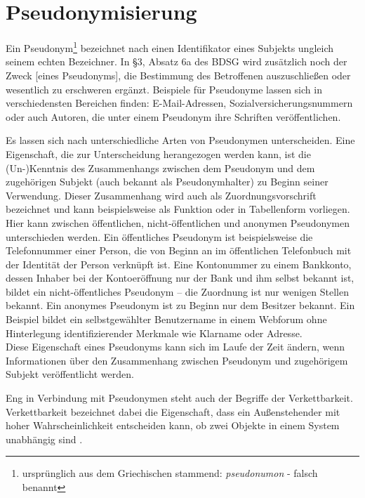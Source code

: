 \section{Pseudonymisierung}

\label{sec_basics_pseudonymity}

Ein Pseudonym\footnote{
	ursprünglich aus dem Griechischen stammend: \textit{pseudonumon} - falsch benannt
} bezeichnet nach \cite{pfitzmann2010} einen Identifikator eines Subjekts ungleich seinem echten Bezeichner. In §3, Absatz 6a des BDSG wird zusätzlich noch der \glqq Zweck [eines Pseudonyms], die Bestimmung des Betroffenen auszuschließen oder wesentlich zu erschweren\grqq{}\cite{TODO} ergänzt. Beispiele für Pseudonyme lassen sich in verschiedensten Bereichen finden: E-Mail-Adressen, Sozialversicherungsnummern oder auch Autoren, die unter einem Pseudonym ihre Schriften veröffentlichen.

Es lassen sich nach \cite{pfitzmann1990} unterschiedliche Arten von Pseudonymen unterscheiden. Eine Eigenschaft, die zur Unterscheidung herangezogen werden kann, ist die (Un-)Kenntnis des Zusammenhangs zwischen dem Pseudonym und dem zugehörigen Subjekt (auch bekannt als Pseudonymhalter) zu Beginn seiner Verwendung. Dieser Zusammenhang wird auch als Zuordnungsvorschrift bezeichnet und kann beispielsweise als Funktion oder in Tabellenform vorliegen.\\
Hier kann zwischen öffentlichen, nicht-öffentlichen und anonymen Pseudonymen unterschieden werden. Ein öffentliches Pseudonym ist beispielsweise die Telefonnummer einer Person, die von Beginn an im öffentlichen Telefonbuch mit der Identität der Person verknüpft ist. Eine Kontonummer zu einem Bankkonto, dessen Inhaber bei der Kontoeröffnung nur der Bank und ihm selbst bekannt ist, bildet ein nicht-öffentliches Pseudonym -- die Zuordnung ist nur wenigen Stellen bekannt. Ein anonymes Pseudonym ist zu Beginn nur dem Besitzer bekannt. Ein Beispiel bildet ein selbstgewählter Benutzername in einem Webforum ohne Hinterlegung identifizierender Merkmale wie Klarname oder Adresse.\\
Diese Eigenschaft eines Pseudonyms kann sich im Laufe der Zeit ändern, wenn Informationen über den Zusammenhang zwischen Pseudonym und zugehörigem Subjekt veröffentlicht werden.

Eng in Verbindung mit Pseudonymen steht auch der Begriffe der Verkettbarkeit. 
Verkettbarkeit bezeichnet dabei die Eigenschaft, dass ein Außenstehender mit hoher Wahrscheinlichkeit entscheiden kann, ob zwei Objekte in einem System unabhängig sind \cite{pfitzmann2010}.

